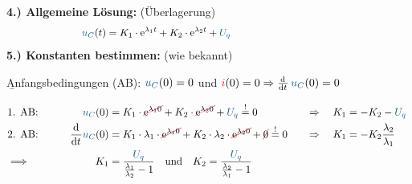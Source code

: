 %
\begin{frame}\ftx{\subsubsecname}%
    \textbf{4.) Allgemeine Lösung:} (Überlagerung)%
    \begin{align}
        &&
            \ecv{u_C}(t) &= K_1 \cdot \mathrm{e}^{\lambda_1 t} + K_2 \cdot \mathrm{e}^{\lambda_2 t} + \ecv{U_q} \nonumber\\[-14pt]
        &\hphantom{1Rooooooo}&\hphantom{2Loooooo}&\hphantom{2Roooooooooooooooooooooooooooooooooo}&\hphantom{3Loooooo}&\hphantom{3Roooooooooo} \nonumber %
    \end{align}
    \pause%
    \textbf{5.) Konstanten bestimmen:} (wie bekannt)

    \b{\vspace{4pt}Anfangsbedingungen (AB): $\ecv{u_C}(0)=0$ und $\eci{i}(0)=0 \Rightarrow \dt\, \ecv{u_C}(0) = 0 $}

    \begin{align}
        &\hphantom{1Rooooooo}&\hphantom{2Loooooo}&\hphantom{2Roooooooooooooooooooooooooooooooooo}&\hphantom{3Loooooo}&\hphantom{3Roooooooooo} \nonumber\\[-15pt] %
        &\text{1. AB:}&
            \ecv{u_C}(0) &= K_1 \cdot \redcancel{\mathrm{e}^{\lambda_1 0}} + K_2 \cdot \redcancel{\mathrm{e}^{\lambda_2 0}} + \ecv{U_q} \overset{!}{=} 0 & \Rightarrow\quad K_1 &= -K_2 -\ecv{U_q} \nonumber\\
        &\text{2. AB:}&
            \dt \ecv{u_C}(0) &= K_1 \cdot \lambda_1 \cdot \redcancel{\mathrm{e}^{\lambda_1 0}} + K_2 \cdot \lambda_2 \cdot \redcancel{\mathrm{e}^{\lambda_2 0}} + \redcancel{0} \overset{!}{=} 0 &  \Rightarrow\quad K_1 &= - K_2 \frac{\lambda_2}{\lambda_1} \nonumber\\
        &\Longrightarrow&
            K_1 &=  \frac{\ecv{U_q}}{\frac{\lambda_1}{\lambda_2}-1} \quad\text{und}\quad
                K_2 = \frac{\ecv{U_q}}{\frac{\lambda_2}{\lambda_1}-1}
            \label{eq:dgl:rlc:dc:konstanten:aperiodisch}
    \end{align}

\end{frame}


